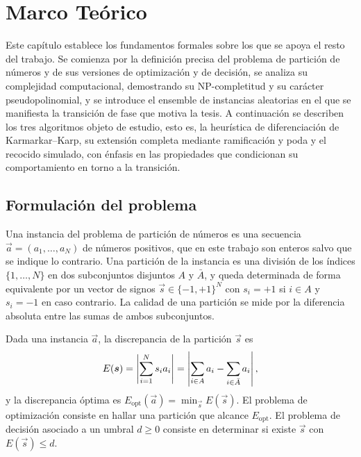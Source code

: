 \chapter{Marco Teórico}\label{chapter:background}

\newenvironment{demostracion}{\par\noindent\textit{Demostración.}\ }{\hfill$\square$\par\medskip}

Este capítulo establece los fundamentos formales sobre los que se apoya el resto del trabajo. Se comienza por la definición precisa del problema de partición de números y de sus versiones de optimización y de decisión, se analiza su complejidad computacional, demostrando su NP-completitud y su carácter pseudopolinomial, y se introduce el ensemble de instancias aleatorias en el que se manifiesta la transición de fase que motiva la tesis. A continuación se describen los tres algoritmos objeto de estudio, esto es, la heurística de diferenciación de Karmarkar--Karp, su extensión completa mediante ramificación y poda y el recocido simulado, con énfasis en las propiedades que condicionan su comportamiento en torno a la transición.

\section{Formulación del problema}

Una instancia del problema de partición de números es una secuencia $\vec{a} = (a_1, \ldots, a_N)$ de números positivos, que en este trabajo son enteros salvo que se indique lo contrario. Una partición de la instancia es una división de los índices $\{1, \ldots, N\}$ en dos subconjuntos disjuntos $A$ y $\bar{A}$, y queda determinada de forma equivalente por un vector de signos $\vec{s} \in \{-1,+1\}^N$ con $s_i = +1$ si $i \in A$ y $s_i = -1$ en caso contrario. La calidad de una partición se mide por la diferencia absoluta entre las sumas de ambos subconjuntos.

\begin{definition}\label{def:discrepancy}
Dada una instancia $\vec{a}$, la discrepancia de la partición $\vec{s}$ es
\begin{equation}
    E(\boldsymbol{s}) = \left\lvert \sum_{i=1}^{N} s_i a_i \right\rvert = \left\lvert \sum_{i \in A} a_i - \sum_{i \in \bar{A}} a_i \right\rvert,
    \label{eq:bg-discrepancy}
\end{equation}
y la discrepancia óptima es $E_{\mathrm{opt}}(\vec{a}) = \min_{\vec{s}} E(\vec{s})$. El problema de optimización consiste en hallar una partición que alcance $E_{\mathrm{opt}}$. El problema de decisión asociado a un umbral $d \geq 0$ consiste en determinar si existe $\vec{s}$ con $E(\vec{s}) \leq d$.
\end{definition}

